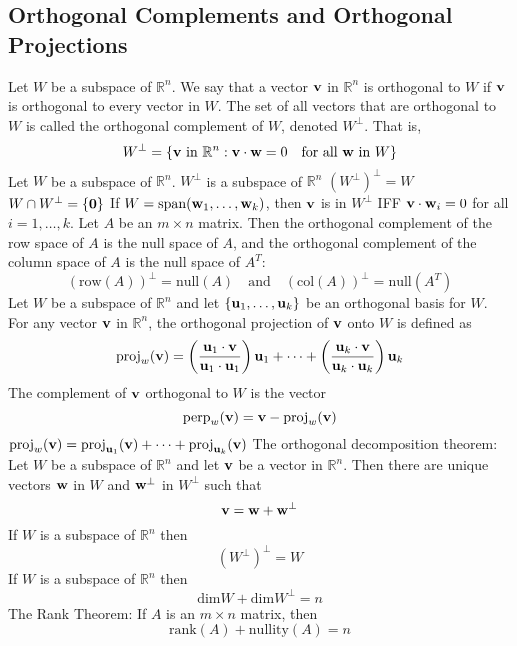 \documentclass{article}
\begin{document}
        \subsection{Orthogonal Complements and Orthogonal Projections}
        \begin{outline}
            \1 Let $W$ be a subspace of \(\mathbb R^n\). We say that a vector \(\vb v\) in \(\mathbb R^n\) is orthogonal to $W$ if \(\vb v\) is orthogonal to every vector in $W$. The set of all vectors that are orthogonal to $W$ is called the orthogonal complement of $W$, denoted \(W^{\perp}\). That is, \[W^\perp=\{\vb v\text{ in }\mathbb R^n:\vb v\cdot\vb w=0\quad \text{for all }\vb w\text{ in }W\}\]
            \1 Let $W$ be a subspace of \(\mathbb R^n\). 
                \2 \(W^\perp\) is a subspace of \(\mathbb R^n\)
                \2 \((W^\perp)^\perp=W\)
                \2 \(W\cap W^\perp=\{\vb 0\}\)
                \2 If \(W=\text{span}(\vb w_1,\ldots,\vb w_k)\), then $\vb v$ is in \(W^\perp\) IFF \(\vb v\cdot\vb w_i=0\) for all \(i=1,\ldots,k\). 
            \1 Let $A$ be an \(m\times n\) matrix. Then the orthogonal complement of the row space of $A$ is the null space of $A$, and the orthogonal complement of the column space of $A$ is the null space of \(A^T\): \[(\text{row}(A))^\perp=\text{null}(A)\quad\text{and}\quad(\text{col}(A))^\perp=\text{null}(A^T)\]
            \1 Let $W$ be a subspace of \(\mathbb R^n\) and let \(\{\vb u_1,\ldots,\vb u_k\}\) be an orthogonal basis for $W$. For any vector \(\vb v\) in \(\mathbb R^n\), the orthogonal projection of \(\vb v\) onto $W$ is defined as \[\text{proj}_w(\vb v)=\left(\dfrac{\vb u_1\cdot\vb v}{\vb u_1\cdot\vb u_1}\right)\vb u_1+\cdots+\left(\dfrac{\vb u_k\cdot \vb v}{\vb u_k\cdot\vb u_k}\right)\vb u_k\]The complement of \(\vb v\) orthogonal to $W$ is the vector \[\text{perp}_w(\vb v)=\vb v-\text{proj}_w(\vb v)\]
            \1 \(\text{proj}_w(\vb v)=\text{proj}_{\vb u_1}(\vb v)+\cdots+\text{proj}_{\vb u_k}(\vb v)\)
            \1 The orthogonal decomposition theorem: Let $W$ be a subspace of \(\mathbb R^n\) and let \(\vb v\) be a vector in \(\mathbb R^n\). Then there are unique vectors \(\vb w\) in $W$ and \(\vb w^\perp\) in \(W^\perp\) such that \[\vb v=\vb w+\vb w^\perp\]
            \1 If $W$ is a subspace of $\mathbb R^n$ then \[(W^\perp)^\perp=W\]
            \1 If $W$ is a subspace of $\mathbb R^n$ then \[\text{dim}W+\text{dim}W^\perp=n\]
            \1 The Rank Theorem: If $A$ is an \(m\times n\) matrix, then \[\text{rank}(A)+\text{nullity}(A)=n\]


        \end{outline}
\end{document}
